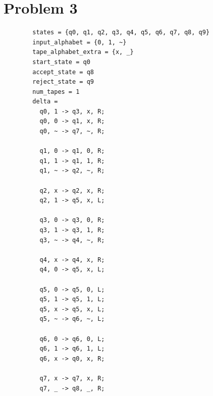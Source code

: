 \documentclass{article}
\newenvironment{problem}[1]{
  \nobreak\section*{Problem #1}
}{}
\begin{document}
  \pagebreak
  \begin{problem}{3}
    \begin{center}
      \begin{verbatim}
        states = {q0, q1, q2, q3, q4, q5, q6, q7, q8, q9}
        input_alphabet = {0, 1, ~}
        tape_alphabet_extra = {x, _}
        start_state = q0
        accept_state = q8
        reject_state = q9
        num_tapes = 1
        delta =
          q0, 1 -> q3, x, R;
          q0, 0 -> q1, x, R;
          q0, ~ -> q7, ~, R;
          
          q1, 0 -> q1, 0, R;
          q1, 1 -> q1, 1, R;
          q1, ~ -> q2, ~, R;
        
          q2, x -> q2, x, R;
          q2, 1 -> q5, x, L;
        
          q3, 0 -> q3, 0, R;
          q3, 1 -> q3, 1, R;
          q3, ~ -> q4, ~, R;
        
          q4, x -> q4, x, R;
          q4, 0 -> q5, x, L;
        
          q5, 0 -> q5, 0, L;
          q5, 1 -> q5, 1, L;
          q5, x -> q5, x, L;
          q5, ~ -> q6, ~, L;
        
          q6, 0 -> q6, 0, L;
          q6, 1 -> q6, 1, L;
          q6, x -> q0, x, R;
        
          q7, x -> q7, x, R;
          q7, _ -> q8, _, R;
      \end{verbatim}


\end{center}
\end{problem}
\end{document}
